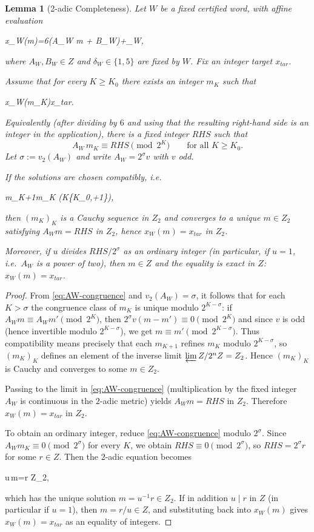 \documentclass[11pt,letterpaper]{amsart}
\def\mathrm#1{#1}%
\def\mathbb#1{#1}%
\def\[{ }%
\def\]{ }%
\theoremstyle{definition}
\theoremstyle{plain}
\newtheorem{lemma}{Lemma}
\theoremstyle{plain}
\theoremstyle{remark}
\begin{document}
\begin{lemma}[2-adic Completeness]
\label{lem:linear-hensel}
Let $W$ be a fixed certified word, with affine evaluation
\[
x_W(m)=6\bigl(A_W m + B_W\bigr)+\delta_W,
\]
where $A_W,B_W\in\mathbb Z$ and $\delta_W\in\{1,5\}$ are fixed by $W$.
Fix an integer target $x_{\mathrm{tar}}$.

Assume that for every $K\ge K_0$ there exists an integer $m_K$ such that
\[
x_W(m_K)\equiv x_{\mathrm{tar}}.
\]
Equivalently (after dividing by $6$ and using that the resulting right-hand side is
an integer in the application), there is a fixed integer $\mathrm{RHS}$ such that
\begin{equation}
\label{eq:AW-congruence}
A_W\, m_K \equiv \mathrm{RHS}\pmod{2^K}\qquad\text{for all }K\ge K_0.
\end{equation}
Let $\sigma:=v_2(A_W)$ and write $A_W=2^\sigma v$ with $v$ odd.

If the solutions are chosen compatibly, i.e.
\[
m_{K+1}\equiv m_K \qquad (K\ge \max\{K_0,\sigma+1\}),
\]
then $(m_K)_K$ is a Cauchy sequence in $\mathbb Z_2$ and converges to a unique
$m\in\mathbb Z_2$ satisfying $A_W m=\mathrm{RHS}$ in $\mathbb Z_2$, hence
$x_W(m)=x_{\mathrm{tar}}$ in $\mathbb Z_2$.

Moreover, if $u$ divides $\mathrm{RHS}/2^{\sigma}$ as an ordinary integer (in particular,
if $u=1$, i.e.\ $A_W$ is a power of two), then $m\in\mathbb Z$ and the equality is exact in
$\mathbb Z$: $x_W(m)=x_{\mathrm{tar}}$.
\end{lemma}

\begin{proof}
From \eqref{eq:AW-congruence} and $v_2(A_W)=\sigma$, it follows that for each $K>\sigma$ the
congruence class of $m_K$ is unique modulo $2^{K-\sigma}$: if $A_W m\equiv A_W m'\pmod{2^K}$,
then $2^\sigma v(m-m')\equiv 0\pmod{2^K}$ and since $v$ is odd (hence invertible modulo $2^{K-\sigma}$),
we get $m\equiv m'\pmod{2^{K-\sigma}}$.
Thus compatibility means precisely that each $m_{K+1}$ refines $m_K$ modulo $2^{K-\sigma}$,
so $(m_K)_K$ defines an element of the inverse limit $\varprojlim \mathbb Z/2^n\mathbb Z=\mathbb Z_2$.
Hence $(m_K)_K$ is Cauchy and converges to some $m\in\mathbb Z_2$.

Passing to the limit in \eqref{eq:AW-congruence} (multiplication by the fixed integer $A_W$
is continuous in the $2$-adic metric) yields $A_W m=\mathrm{RHS}$ in $\mathbb Z_2$.
Therefore $x_W(m)=x_{\mathrm{tar}}$ in $\mathbb Z_2$.

To obtain an ordinary integer, reduce \eqref{eq:AW-congruence} modulo $2^{\sigma}$.
Since $A_W m_K\equiv 0\pmod{2^\sigma}$ for every $K$, we obtain $\mathrm{RHS}\equiv 0\pmod{2^{\sigma}}$,
so $\mathrm{RHS}=2^{\sigma} r$ for some $r\in\mathbb Z$.
Then the $2$-adic equation becomes
\[
u\,m=r \qquad{}\mathbb Z_2,
\]
which has the unique solution $m=u^{-1}r\in\mathbb Z_2$.
If in addition $u\mid r$ in $\mathbb Z$ (in particular if $u=1$), then $m=r/u\in\mathbb Z$,
and substituting back into $x_W(m)$ gives $x_W(m)=x_{\mathrm{tar}}$ as an equality of integers.
\end{proof}
\end{document}
